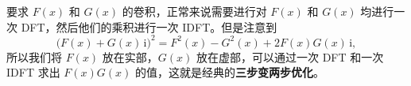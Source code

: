 要求 $F(x)$ 和 $G(x)$ 的卷积，正常来说需要进行对 $F(x)$ 和 $G(x)$ 均进行一次 DFT，然后他们的乘积进行一次 IDFT。但是注意到
\[
\bigl(F(x) + G(x)\,\mathrm{i}\bigr)^2 = F^2(x) - G^2(x) + 2F(x)G(x)\,\mathrm{i},
\]
所以我们将 $F(x)$ 放在实部，$G(x)$ 放在虚部，可以通过一次 DFT 和一次 IDFT 求出 $F(x)G(x)$ 的值，这就是经典的\textbf{三步变两步优化}。
